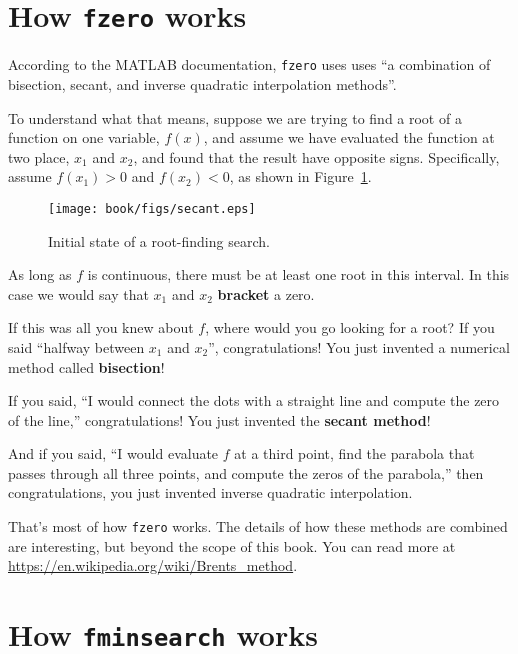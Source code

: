 \documentclass[main.tex]{subfiles}
\begin{document}
\section{How {\tt fzero} works}
\label{sect:howfzero}

According to the MATLAB documentation, {\tt fzero} uses uses ``a combination of bisection, secant, and inverse quadratic interpolation methods''.


To understand what that means, suppose we are trying to find a root of a function on one variable, $f(x)$, and assume we have evaluated the function at two place, $x_1$ and $x_2$, and found that the result have opposite signs.  Specifically, assume $f(x_1) > 0$ and $f(x_2) < 0$, as shown in Figure~\ref{fig:secant}.

\begin{figure}
\centerline{\texttt{[image: book/figs/secant.eps]}}
\caption{Initial state of a root-finding search.}
\label{fig:secant}
\end{figure}

As long as $f$ is continuous, there must be at least one root in this interval.  In this case we would say that $x_1$ and $x_2$
{\bf bracket} a zero.


If this was all you knew about $f$, where would you go looking for
a root?  If you said ``halfway between $x_1$ and $x_2$'',
congratulations!  You just invented a numerical method called
{\bf bisection}!

If you said, ``I would connect the dots with a straight line
and compute the zero of the line,''
congratulations!  You just invented the {\bf secant method}!

And if you said, ``I would evaluate $f$ at a third point, find the
parabola that passes through all three points, and compute the zeros
of the parabola,'' then congratulations, you just invented inverse quadratic interpolation.

That's most of how {\tt fzero} works.  The details of how these methods are combined are interesting, but beyond the scope of this book.  You can read more at \url{https://en.wikipedia.org/wiki/Brents_method}.  


\section{How {\tt fminsearch} works}
\label{sect:howfminsearch}
\end{document}

